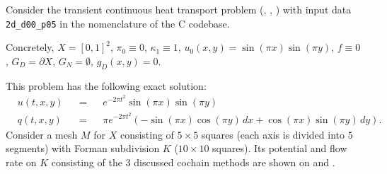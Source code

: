 \begin{example}
  \label{idec/diffusion/continuous/transient/examples/2d_d00_p05-example}
  Consider the transient continuous heat transport problem
  (,
   ,
   )
  with input data \verb|2d_d00_p05| in the nomenclature of the C codebase.

  Concretely,
    $X = [0, 1]^2$,
    $\pi_0 \equiv 0$,
    $\kappa_1 \equiv 1$,
    $u_0(x, y) = \sin(\pi x) \sin(\pi y)$,
    $f \equiv 0$,
    $G_D = \partial X$,
    $G_N = \emptyset$,
    $g_D(x, y) = 0$.

  This problem has the following exact solution:
  \begin{subequations}
    \begin{alignat}{3}
      & u(t, x, y) && = && e^{-2 \pi t^2} \sin(\pi x) \sin(\pi y) \\
      & q(t, x, y) && =
      && \pi e^{-2 \pi t^2}
         (-\sin(\pi x) \cos(\pi y)\, d x + \cos(\pi x) \sin(\pi y)\, d y).
    \end{alignat}
  \end{subequations}
  Consider a mesh $M$ for $X$ consisting of $5 \times 5$ squares (each axis is
  divided into $5$ segments) with Forman subdivision $K$
  ($10 \times 10$ squares).
  Its potential and flow rate on $K$ consisting of the $3$ discussed cochain
  methods are shown on
  and
  .
\end{example}
